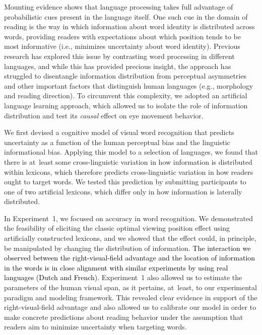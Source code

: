 \documentclass[doc,biblatex]{apa7}
\newcommand\newmaterial[1]{\textcolor{black}{#1}}
\begin{document}
Mounting evidence shows that language processing takes full advantage of probabilistic cues present in the language itself. One such cue in the domain of reading is the way in which information about word identity is distributed across words, providing readers with expectations about which position tends to be most informative (i.e., minimizes uncertainty about word identity). Previous research has explored this issue by contrasting word processing in different languages, and while this has provided precious insight, the approach has struggled to disentangle information distribution from perceptual asymmetries and other important factors that distinguish human languages (e.g., morphology and reading direction). To circumvent this complexity, we adopted an artificial language learning approach, which allowed us to isolate the role of information distribution and test its \textit{causal} effect on eye movement behavior.

We first devised a cognitive model of visual word recognition that predicts uncertainty as a function of the human perceptual bias and the linguistic informational bias. Applying this model to a selection of languages, we found that there is at~least some cross-linguistic variation in how information is distributed within lexicons, which therefore predicts cross-linguistic variation in how readers ought to target words. We tested this prediction by submitting participants to one of two artificial lexicons, which differ only in how information is laterally distributed.

In Experiment~1, we focused on accuracy in word recognition. We demonstrated the feasibility of eliciting the classic optimal viewing position effect \parencite{ORegan:1984, Brysbaert:2005, Hyona:2011} using artificially constructed lexicons, and we showed that the effect could, in principle, be manipulated by changing the distribution of information. \newmaterial{The interaction we observed between the right-visual-field advantage and the location of information in the words is in close alignment with similar experiments by \textcite{Brysbaert:1996} using real languages (Dutch and French).} Experiment~1 also allowed us to estimate the parameters of the human visual span, as it pertains, at~least, to our experimental paradigm and modeling framework. This revealed clear evidence in support of the right-visual-field advantage and also allowed us to calibrate our model in order to make concrete predictions about reading behavior under the assumption that readers aim to minimize uncertainty when targeting words.
\end{document}
